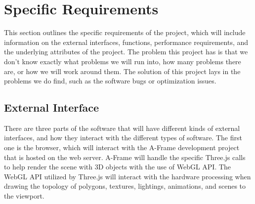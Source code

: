 \documentclass[letterpaper,10pt,draftclsnofoot,onecolumn,compsoc]{IEEEtran}
\begin{document}
\section{Specific Requirements}
\begin{singlespace}
\noindent
This section outlines the specific requirements of the project, which will include information on the external interfaces, functions, performance requirements, and the underlying attributes of the project. The problem this project has is that we don't know exactly what problems we will run into, how many problems there are, or how we will work around them. The solution of this project lays in the problems we do find, such as the software bugs or optimization issues.

\subsection{External Interface}
\begin{singlespace}
\noindent
There are three parts of the software that will have different kinds of external interfaces, and how they interact with the different types of software. The first one is the browser, which will interact with the A-Frame development project that is hosted on the web server. A-Frame will handle the specific Three.js calls to help render the scene with 3D objects with the use of WebGL API. The WebGL API utilized by Three.js will interact with the hardware processing when drawing the topology of polygons, textures, lightings, animations, and scenes to the viewport. \\


\end{singlespace}
\end{singlespace}
\end{document}
